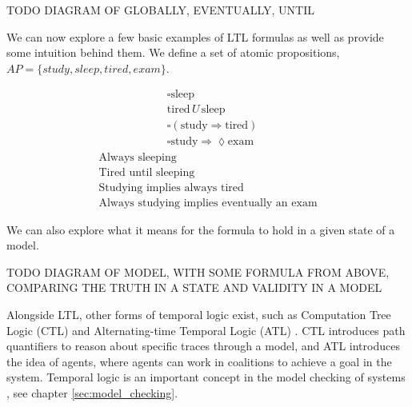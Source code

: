 \par
TODO DIAGRAM OF GLOBALLY, EVENTUALLY, UNTIL
\par
We can now explore a few basic examples of LTL formulas as well as provide some intuition behind them. We define a set of atomic propositions, $AP = \{study, sleep, tired, exam\}$.
\begin{multicols}{2}
    \[
    \begin{aligned}
    &\square \text{sleep} \\
    &\text{tired} \, U \, \text{sleep} \\
    &\square (\text{study} \Rightarrow \text{tired}) \\
    &\square \text{study} \Rightarrow \lozenge \text{exam}
    \end{aligned}
    \]
    \vline
    \[
    \begin{aligned}
    \text{Always sleeping} \\
    \text{Tired until sleeping} \\
    \text{Studying implies always tired} \\
    \text{Always studying implies eventually an exam}
    \end{aligned}
    \]
    \end{multicols}
\par
We can also explore what it means for the formula to hold in a given state of a model.
\par
TODO DIAGRAM OF MODEL, WITH SOME FORMULA FROM ABOVE, COMPARING THE TRUTH IN A STATE AND VALIDITY IN A MODEL
\par
Alongside LTL, other forms of temporal logic exist, such as Computation Tree Logic (CTL) \cite{temporal_and_modal_logic} and Alternating-time Temporal Logic (ATL) \cite{atl}. CTL introduces path quantifiers to reason about specific traces through a model, and ATL introduces the idea of agents, where agents can work in coalitions to achieve a goal in the system. Temporal logic is an important concept in the model checking of systems \cite{principles_of_model_checking}, see chapter \ref{sec:model_checking}. 
